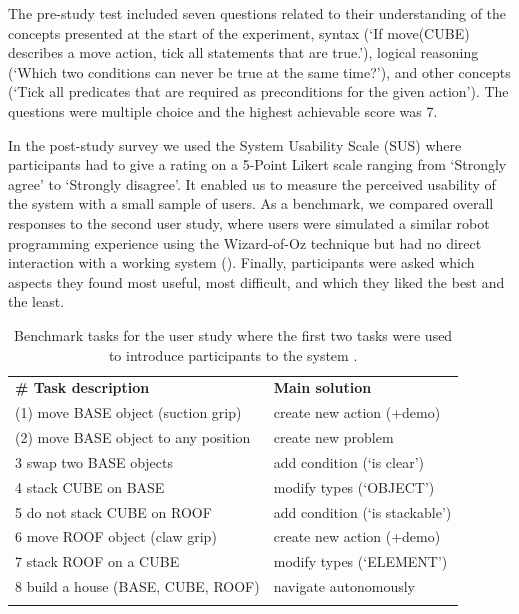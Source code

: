 The pre-study test included seven questions related to their understanding of the concepts presented at the start of the experiment, \eg syntax (`If move(CUBE) describes a move action, tick all statements that are true.'), logical reasoning 
(`Which two conditions can never be true at the same time?'), and other concepts (`Tick all predicates that are required as preconditions for the given action').
The questions were multiple choice and the highest achievable score was 7.

In the post-study survey we used the System Usability Scale (SUS) \cite{brooke2013sus} where participants had to give a rating on a 5-Point Likert scale ranging from `Strongly agree' to `Strongly disagree'.
It enabled us to measure the perceived usability of the system with a small sample of users.
As a benchmark, we compared overall responses to the second user study, where users were simulated a similar robot programming experience using the Wizard-of-Oz technique but had no direct interaction with a working system ().
Finally, participants were asked which aspects they found most useful, most difficult, and which they liked the best and the least.

\begin{table}
	\centering
	\caption{Benchmark tasks for the user study where the first two tasks were used to introduce participants to the system \cite{liang2019d}.}
	\label{table:userstudytasks}
	\begin{center}
		\begin{tabular}{l@{\hskip2.0pt}l}
\hline\noalign{\smallskip}
			\textbf{\# Task description} & \textbf{Main solution} \\ 
\noalign{\smallskip}\hline\noalign{\smallskip}
			(1) move BASE object (suction grip) & create new action (+demo) \\
			(2) move BASE object to any position & create new problem \\
			3 swap two BASE objects & add condition (`is clear') \\
			4 stack CUBE on BASE & modify types (`OBJECT')\\
			5 do not stack CUBE on ROOF & add condition (`is stackable')\\
			6 move ROOF object (claw grip) & create new action (+demo) \\
			7 stack ROOF on a CUBE & modify types (`ELEMENT') \\
			8 build a house (BASE, CUBE, ROOF) & navigate autonomously \\ 
\noalign{\smallskip}\hline
		\end{tabular}
	\end{center}
\end{table}

